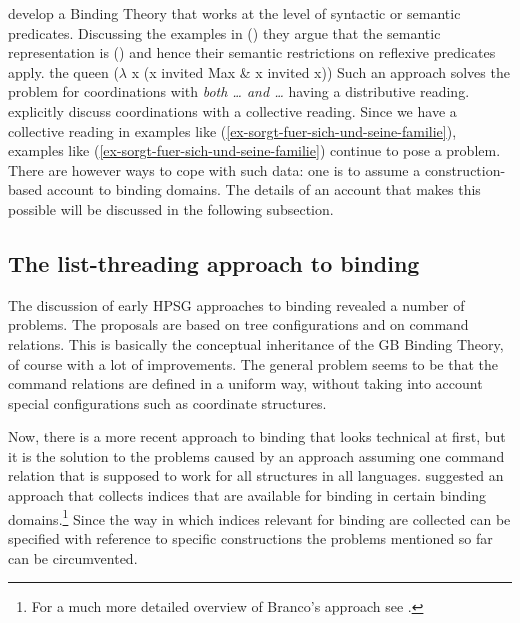 \documentclass[output=paper
 	        ,biblatex
                ,babelshorthands
                ,newtxmath
                ,draftmode
                ,colorlinks, citecolor=brown
]{langscibook}
\begin{document}
\citet{RR93a} develop a Binding Theory that works at the level of syntactic or semantic
predicates. Discussing the examples in () they argue that the semantic representation is
() and hence their semantic restrictions on reflexive predicates apply.
\eal
{}
\zl
\ea
the queen ($\lambda$ x (x invited Max \& x invited x))
\z
Such an approach solves the problem for coordinations with \emph{both \ldots{} and \ldots} having a
distributive reading. \citet[]{RR93a} explicitly discuss coordinations with a collective
reading. Since we have a collective reading in examples like
(\ref{ex-sorgt-fuer-sich-und-seine-familie}), examples like (\ref{ex-sorgt-fuer-sich-und-seine-familie}) continue to pose a problem. There are
however ways to cope with such data: one is to assume a construction-based account to binding
domains. The details of an account that makes this possible will be discussed in the following subsection.


\subsection{The list-threading approach to binding}


The discussion of early HPSG approaches to binding revealed a number of problems. The proposals are
based on tree configurations and on command relations. This is basically the conceptual inheritance
of the GB Binding Theory, of course with a lot of improvements. The general problem seems to be that
the command relations are defined in a uniform way, without taking into account special configurations such as coordinate structures.

Now, there is a more recent approach to binding that looks technical at first, but it is the
solution to the problems caused by an approach assuming one command relation that is supposed
to work for all structures in all languages. \citet{Branco2002a} suggested an approach that collects
indices that are available for binding in certain binding domains.\footnote{%
For a much more detailed overview of Branco's approach see .
} Since the way in which indices
relevant for binding are collected can be specified with reference to specific constructions the
problems mentioned so far can be circumvented. 
\end{document}
